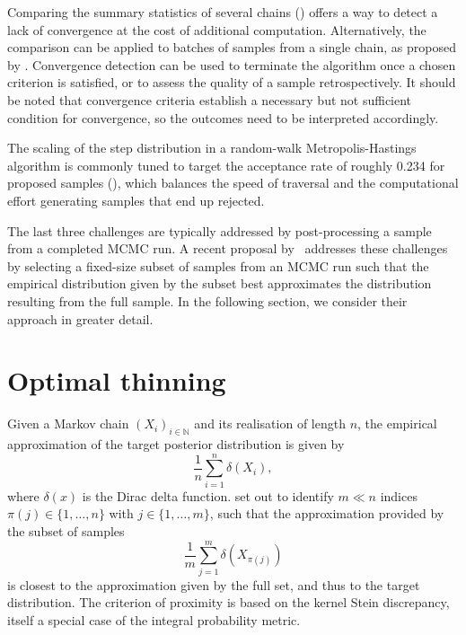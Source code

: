 \documentclass[12pt,a4paper]{report}
\begin{document}
Comparing the summary statistics of several chains (\cite{gelmanInferenceIterativeSimulation1992,brooksGeneralMethodsMonitoring1998,vehtariRankNormalizationFoldingLocalization2021}) offers a way to detect a lack of convergence at the cost of additional computation. Alternatively, the comparison can be applied to batches of samples from a single chain, as proposed by \cite{vatsRevisitingGelmanRubin2021}. Convergence detection can be used to terminate the algorithm once a chosen criterion is satisfied, or to assess the quality of a sample retrospectively. It should be noted that convergence criteria establish a necessary but not sufficient condition for convergence, so the outcomes need to be interpreted accordingly.

The scaling of the step distribution in a random-walk Metropolis-Hastings algorithm is commonly tuned to target the acceptance rate of roughly 0.234 for proposed samples (\cite{gelmanEfficientMetropolisJumping1996,gelmanWeakConvergenceOptimal1997,robertsOptimalScalingVarious2001}), which balances the speed of traversal and the computational effort generating samples that end up rejected.

The last three challenges are typically addressed by post-processing a sample from a completed MCMC run. A recent proposal by~\cite{riabizOptimalThinningMCMC2022} addresses these challenges by selecting a fixed-size subset of samples from an MCMC run such that the empirical distribution given by the subset best approximates the distribution resulting from the full sample. In the following section, we consider their approach in greater detail.


\section{Optimal thinning}

Given a Markov chain $(X_i)_{i \in \mathbb{N}}$ and its realisation of length $n$, the empirical approximation of the target posterior distribution is given by
$$\frac{1}{n} \sum_{i=1}^n \delta(X_i),$$
where $\delta(x)$ is the Dirac delta function.
\cite{riabizOptimalThinningMCMC2022} set out to identify $m \ll n$ indices $\pi(j) \in \{1,\dots, n\}$ with $j\in\{1, \dots, m\}$, such that the approximation provided by the subset of samples
\begin{equation}
\frac{1}{m} \sum_{j=1}^m \delta(X_{\pi(j)})
\label{eq:thinned-sample}
\end{equation}
is closest to the approximation given by the full set, and thus to the target distribution. The criterion of proximity is based on the kernel Stein discrepancy, itself a special case of the integral probability metric.
\end{document}
